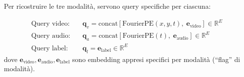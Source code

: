 \documentclass[12pt,a4paper]{article}
\begin{document}
Per ricostruire le tre modalit\`a, servono query specifiche per ciascuna:

\begin{formulabox}
\begin{align}
    \text{Query video:} \quad & \mathbf{q}_v = \text{concat}\!\left[\text{FourierPE}(x, y, t), \; \mathbf{e}_{\text{video}}\right] \in \mathbb{R}^E \\
    \text{Query audio:} \quad & \mathbf{q}_a = \text{concat}\!\left[\text{FourierPE}(t), \; \mathbf{e}_{\text{audio}}\right] \in \mathbb{R}^E \\
    \text{Query label:} \quad & \mathbf{q}_l = \mathbf{e}_{\text{label}} \in \mathbb{R}^E
\end{align}
dove $\mathbf{e}_{\text{video}}, \mathbf{e}_{\text{audio}}, \mathbf{e}_{\text{label}}$ sono embedding appresi specifici per modalit\`a (``flag'' di modalit\`a).
\end{formulabox}
\end{document}
